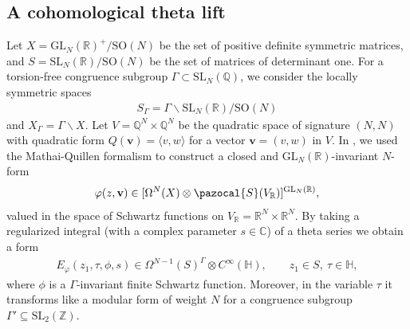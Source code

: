 \documentclass[twoside,a4paper,10pt]{article} %
\newcommand{\8}{\infty}
\newcommand{\Z}{\mathbb{Z}}
\newcommand{\vbf}{\mathbf{v}}
\newcommand{\SO}{\mathrm{SO}}
\newcommand{\SL}{\mathrm{SL}}
\newcommand{\GL}{\mathrm{GL}}
\newcommand{\HH}{\mathbb{H}}
\newcommand{\R}{\mathbb{R}}
\newcommand{\Q}{\mathbb{Q}}
\newcommand{\C}{\mathbb{C}}
\newcommand{\Scal}{\pazocal{S}}
\theoremstyle{mytheoremstyle}
\theoremstyle{remark}
\numberwithin{equation}{section}
\begin{document}
\subsection{A cohomological theta lift} \label{section cohomo lift} Let $X = \GL_N(\R)^+/\SO(N)$ be the set of positive definite symmetric matrices, and $S = \SL_N(\R)/\SO(N)$ be the set of matrices of determinant one. For a torsion-free congruence subgroup $\Gamma \subset \SL_N(\Q)$, we consider the locally symmetric spaces 
\begin{align}
S_\Gamma=\Gamma \backslash \SL_N(\R)/\SO(N)
\end{align} and $X_\Gamma=\Gamma \backslash X$. Let $V=\Q^N \times \Q^N$ be the quadratic space of signature $(N,N)$ with quadratic form $Q(\vbf)=\langle v,w \rangle$ for a vector $\vbf=(v,w)$ in $V$. In \cite{rbrsln}, we used the Mathai-Quillen formalism \cite{MQ86} to construct a closed and $\GL_N(\R)$-invariant $N$-form
\begin{align}
\varphi(z,\vbf) \in [\Omega^{N}(X) \otimes \Scal(V_\R)]^{\GL_N(\R)},
\end{align}
valued in the space of Schwartz functions on $V_\R = \R^N \times \R^N$. By taking a regularized integral (with a complex parameter $s \in \C$) of a theta series we obtain a form
\begin{align} \label{E varphi}
E_\varphi(z_1,\tau,\phi,s) \in \Omega^{N-1}(S)^\Gamma \otimes C^\8(\HH) , \qquad z_1 \in S, \ \tau \in \HH,
\end{align}
where $\phi$ is a $\Gamma$-invariant finite Schwartz function. Moreover, in the variable $\tau$ it transforms like a modular form of weight $N$ for a congruence subgroup $\Gamma'\subseteq \SL_2(\Z)$.
\end{document}
